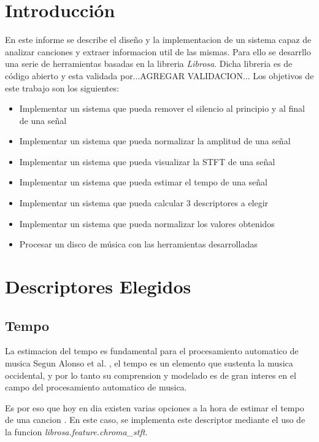 \documentclass[]{article}
\begin{document}
\begin{multicols}{2}
\section{Introducción}
En este informe se describe el diseño y la implementacion de un sistema capaz de
analizar canciones y extraer informacion util de las mismas. Para ello se desarrllo
una serie de herramientas basadas en la libreria \textit{Librosa}. Dicha libreria
es de código abierto y esta validada por...AGREGAR VALIDACION...
\lipsum[2]
\lipsum[3]
Los objetivos de este trabajo son los siguientes:
\begin{itemize}
  \item Implementar un sistema que pueda remover el silencio al principio y al final de una señal
  \item Implementar un sistema que pueda normalizar la amplitud de una señal
  \item Implementar un sistema que pueda visualizar la STFT de una señal
  \item Implementar un sistema que pueda estimar el tempo de una señal
  \item Implementar un sistema que pueda calcular 3 descriptores a elegir
  \item Implementar un sistema que pueda normalizar los valores obtenidos
  \item Procesar un disco de música con las herramientas desarrolladas
\end{itemize}

\section{Descriptores Elegidos}

\subsection{Tempo}
La estimacion del tempo es fundamental para el procesamiento automatico de musica
Segun Alonso et al. \cite{alonso2004tempo}, el tempo es un elemento que sustenta
la musica occidental, y por lo tanto su comprension y modelado es de gran interes
en el campo del procesamiento automatico de musica.

Es por eso que hoy en dia existen varias opciones a la hora de estimar el tempo
de una cancion \cite{goto1997issues}. En este caso, se implementa este descriptor
mediante el uso de la funcion \emph{{librosa.feature.chroma\_stft}}.




\end{multicols}
\end{document}
